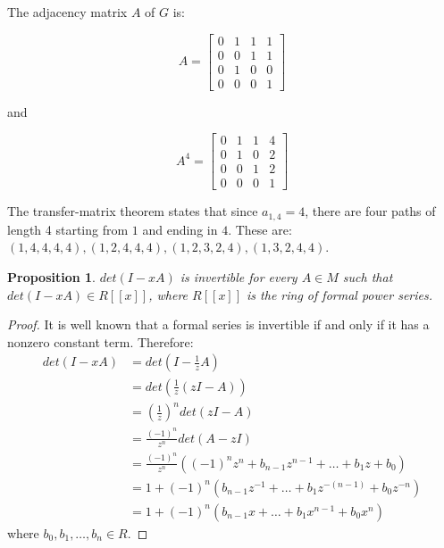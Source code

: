 \documentclass[12pt]{report}
\newtheorem{prop}{Proposition}
\begin{document}
{\begin{figure}[ht]
\end{figure}

\noindent The adjacency matrix $A$ of $G$ is:

\[A= \begin{bmatrix}
	0 & 1 & 1 & 1 \\
    0 & 0 & 1 & 1 \\
    0 & 1 & 0 & 0 \\
    0 & 0 & 0 & 1
\end{bmatrix}\]

and 

\[A^4= \begin{bmatrix}
	0 & 1 & 1 & 4 \\
    0 & 1 & 0 & 2 \\
    0 & 0 & 1 & 2 \\
    0 & 0 & 0 & 1
\end{bmatrix}\]

\noindent The transfer-matrix theorem states that since $a_{1,4} = 4$, there are four paths of length 4 starting from $1$ and ending in $4$. These are: $(1,4,4,4,4),(1,2,4,4,4),(1,2,3,2,4),(1,3,2,4,4)$.

\begin{prop} $det(I-xA)$ is invertible for every $A \in M$ such that $det(I-xA) \in R[[x]]$, where $R[[x]]$ is the ring of formal power series.
\end{prop}

\begin{proof}
It is well known that a formal series is invertible if and only if it has a nonzero constant term. Therefore:
\begin{align*}
det(I-xA) &= det(I-\frac{1}{z} A)  \\
&= det(\frac{1}{z}(zI-A))  \\
&= (\frac{1}{z})^n det(zI-A) \\
&= \frac{(-1)^n}{z^n} det(A-zI) \\
&= \frac{(-1)^n}{z^n} ((-1)^n z^n + b_{n-1} z^{n-1} + \ldots + b_1 z + b_0 ) \\
&= 1 + (-1)^n (b_{n-1} z^{-1} + \ldots + b_1 z^{-(n-1)} + b_0 z^{-n} ) \\
&= 1 + (-1)^n (b_{n-1} x + \ldots + b_1 x^{n-1} + b_0 x^n )
\end{align*}
where $b_0,b_1,\ldots,b_n \in R$.
\end{proof}

}
\end{document}

